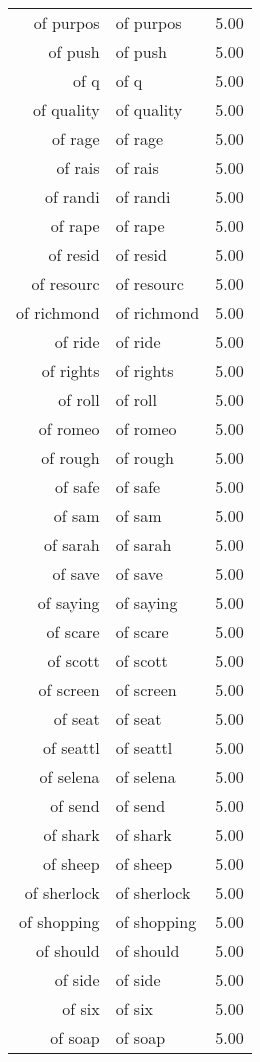 \begin{table}[ht]
\begin{tabular}{rlr}
  of purpos & of purpos & 5.00 \\ 
  of push & of push & 5.00 \\ 
  of q & of q & 5.00 \\ 
  of quality & of quality & 5.00 \\ 
  of rage & of rage & 5.00 \\ 
  of rais & of rais & 5.00 \\ 
  of randi & of randi & 5.00 \\ 
  of rape & of rape & 5.00 \\ 
  of resid & of resid & 5.00 \\ 
  of resourc & of resourc & 5.00 \\ 
  of richmond & of richmond & 5.00 \\ 
  of ride & of ride & 5.00 \\ 
  of rights & of rights & 5.00 \\ 
  of roll & of roll & 5.00 \\ 
  of romeo & of romeo & 5.00 \\ 
  of rough & of rough & 5.00 \\ 
  of safe & of safe & 5.00 \\ 
  of sam & of sam & 5.00 \\ 
  of sarah & of sarah & 5.00 \\ 
  of save & of save & 5.00 \\ 
  of saying & of saying & 5.00 \\ 
  of scare & of scare & 5.00 \\ 
  of scott & of scott & 5.00 \\ 
  of screen & of screen & 5.00 \\ 
  of seat & of seat & 5.00 \\ 
  of seattl & of seattl & 5.00 \\ 
  of selena & of selena & 5.00 \\ 
  of send & of send & 5.00 \\ 
  of shark & of shark & 5.00 \\ 
  of sheep & of sheep & 5.00 \\ 
  of sherlock & of sherlock & 5.00 \\ 
  of shopping & of shopping & 5.00 \\ 
  of should & of should & 5.00 \\ 
  of side & of side & 5.00 \\ 
  of six & of six & 5.00 \\ 
  of soap & of soap & 5.00 \\ 

\end{tabular}
\end{table}
